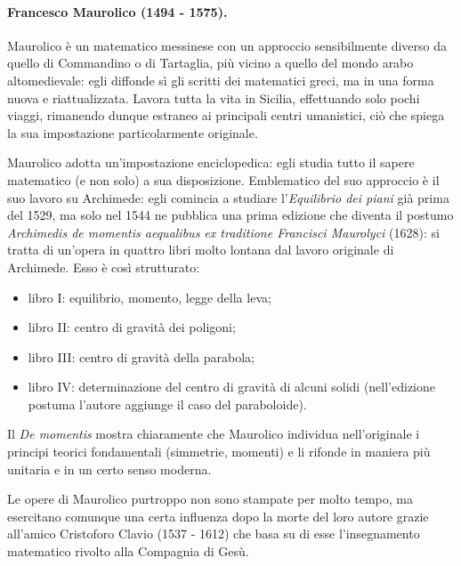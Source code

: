 \paragraph{Francesco Maurolico (1494 - 1575).} Maurolico \`e un matematico messinese con un approccio sensibilmente diverso da quello di Commandino o di Tartaglia, pi\`u vicino a quello del mondo arabo altomedievale: egli diffonde s\`i gli scritti dei matematici greci, ma in una forma nuova e riattualizzata. Lavora tutta la vita in Sicilia, effettuando solo pochi viaggi, rimanendo dunque estraneo ai principali centri umanistici, ci\`o che spiega la sua impostazione particolarmente originale.
\par Maurolico adotta un'impostazione enciclopedica: egli studia tutto il sapere matematico (e non solo) a sua disposizione. Emblematico del suo approccio \`e il suo lavoro su Archimede: egli comincia a studiare l'\textit{Equilibrio dei piani} gi\`a prima del 1529, ma solo nel 1544 ne pubblica una prima edizione che diventa il postumo \textit{Archimedis de momentis aequalibus ex traditione Francisci Maurolyci} (1628): si tratta di un'opera in quattro libri molto lontana dal lavoro originale di Archimede. Esso \`e cos\`i strutturato:
\begin{itemize}
	\item libro I: equilibrio, momento, legge della leva;
	\item libro II: centro di gravit\`a dei poligoni;
	\item libro III: centro di gravit\`a della parabola;
	\item libro IV: determinazione del centro di gravit\`a di alcuni solidi (nell'edizione postuma l'autore aggiunge il caso del paraboloide).
\end{itemize}
\par Il \textit{De momentis} mostra chiaramente che Maurolico individua nell'originale i principi teorici fondamentali (simmetrie, momenti) e li rifonde in maniera pi\`u unitaria e in un certo senso moderna.
\par Le opere di Maurolico purtroppo non sono stampate per molto tempo, ma esercitano comunque una certa influenza dopo la morte del loro autore grazie all'amico Cristoforo Clavio (1537 - 1612) che basa su di esse l'insegnamento matematico rivolto alla Compagnia di Ges\`u.
